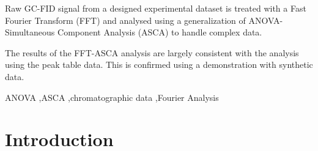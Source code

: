 \documentclass[preprint,12pt]{elsarticle}
\begin{document}
\begin{frontmatter}
\begin{abstract}
\end{abstract}



\begin{highlights}
\item Raw GC-FID signal from a designed experimental dataset is treated with a Fast Fourier Transform (FFT) and analysed using a generalization of ANOVA-Simultaneous Component Analysis (ASCA) to handle complex data.
\item The results of the FFT-ASCA analysis are largely consistent with the analysis using the peak table data. This is confirmed using a demonstration with synthetic data.
\end{highlights}

\begin{keyword}
ANOVA \sep ASCA \sep chromatographic data \sep Fourier Analysis

\end{keyword}

\end{frontmatter}


\section{Introduction}
\label{sec:sample1}
\end{document}
